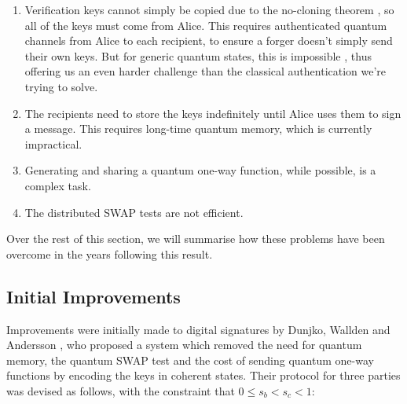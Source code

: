 \documentclass[%
 reprint,
 amsmath,amssymb,
 aps,
 pra,
]{revtex4-1}
\begin{document}
\begin{enumerate}
\item Verification keys cannot simply be copied due to the no-cloning theorem \cite{WZ82}, so all of the keys must come from Alice. This requires authenticated quantum channels from Alice to each recipient, to ensure a forger doesn't simply send their own keys. But for generic quantum states, this is impossible \cite{1181969}, thus offering us an even harder challenge than the classical authentication we're trying to solve.
\item The recipients need to store the keys indefinitely until Alice uses them to sign a message. This requires long-time quantum memory, which is currently impractical.
\item Generating and sharing a quantum one-way function, while possible, is a complex task.
\item The distributed SWAP tests are not efficient.
\end{enumerate}

Over the rest of this section, we will summarise how these problems have been overcome in the years following this result.

\subsection{Initial Improvements}

Improvements were initially made to digital signatures by Dunjko, Wallden and Andersson \cite{PhysRevLett.112.040502}, who proposed a system which removed the need for quantum memory, the quantum SWAP test and the cost of sending quantum one-way functions by encoding the keys in coherent states. Their protocol for three parties was devised as follows, with the constraint that $0 \leq s_b < s_c < 1$:
\end{document}
